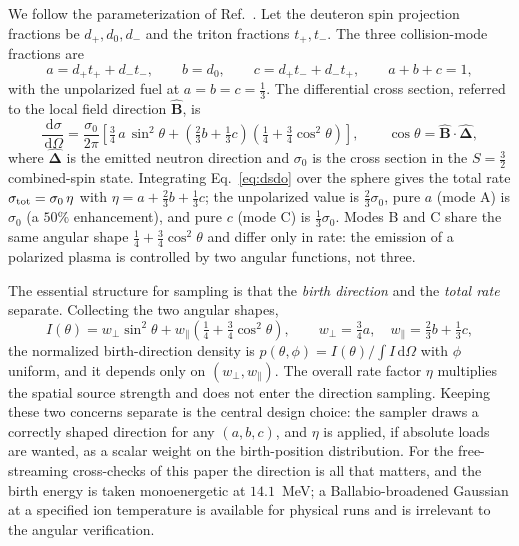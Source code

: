 \documentclass[11pt]{article}
\newcommand{\Bhat}{\hat{\bm{B}}}
\newcommand{\dd}{\,\mathrm{d}}
\begin{document}
We follow the parameterization of Ref.~\cite{schwartz2025}. Let the deuteron spin
projection fractions be $d_+,d_0,d_-$ and the triton fractions $t_+,t_-$. The three
collision-mode fractions are
\begin{equation}
a=d_+t_++d_-t_-,\qquad b=d_0,\qquad c=d_+t_-+d_-t_+,\qquad a+b+c=1,
\label{eq:abc}
\end{equation}
with the unpolarized fuel at $a=b=c=\tfrac13$. The differential cross section, referred to
the local field direction $\Bhat$, is
\begin{equation}
\frac{\dd\sigma}{\dd\Omega}=\frac{\sigma_0}{2\pi}\left[\tfrac34\,a\,\sin^2\theta
+\left(\tfrac23 b+\tfrac13 c\right)\left(\tfrac14+\tfrac34\cos^2\theta\right)\right],
\qquad \cos\theta=\Bhat\cdot\hat{\bm\Delta},
\label{eq:dsdo}
\end{equation}
where $\hat{\bm\Delta}$ is the emitted neutron direction and $\sigma_0$ is the cross
section in the $S=\tfrac32$ combined-spin state. Integrating Eq.~\eqref{eq:dsdo} over the
sphere gives the total rate $\sigma_{\rm tot}=\sigma_0\,\eta$ with
$\eta=a+\tfrac23 b+\tfrac13 c$; the unpolarized value is $\tfrac23\sigma_0$, pure $a$
(mode A) is $\sigma_0$ (a $50\%$ enhancement), and pure $c$ (mode C) is $\tfrac13\sigma_0$.
Modes B and C share the same angular shape $\tfrac14+\tfrac34\cos^2\theta$ and differ only
in rate: the emission of a polarized plasma is controlled by two angular functions, not
three.

The essential structure for sampling is that the \emph{birth direction} and the
\emph{total rate} separate. Collecting the two angular shapes,
\begin{equation}
I(\theta)=w_\perp\sin^2\theta+w_\parallel\!\left(\tfrac14+\tfrac34\cos^2\theta\right),
\qquad w_\perp=\tfrac34 a,\quad w_\parallel=\tfrac23 b+\tfrac13 c,
\label{eq:I}
\end{equation}
the normalized birth-direction density is $p(\theta,\phi)=I(\theta)/\!\int I\dd\Omega$ with
$\phi$ uniform, and it depends only on $(w_\perp,w_\parallel)$. The overall rate factor
$\eta$ multiplies the spatial source strength and does not enter the direction sampling.
Keeping these two concerns separate is the central design choice: the sampler draws a
correctly shaped direction for any $(a,b,c)$, and $\eta$ is applied, if absolute loads are
wanted, as a scalar weight on the birth-position distribution. For the free-streaming
cross-checks of this paper the direction is all that matters, and the birth energy is
taken monoenergetic at $14.1$~MeV; a Ballabio-broadened Gaussian at a specified ion
temperature is available for physical runs and is irrelevant to the angular
verification.
\end{document}
